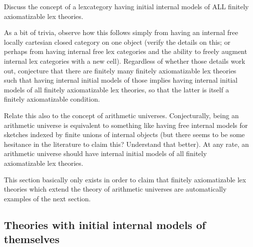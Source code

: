 \begin{TODOblock}
Discuss the concept of a lexcategory having initial internal models of ALL finitely axiomatizable lex theories.

As a bit of trivia, observe how this follows simply from having an internal free locally cartesian closed category on one object (verify the details on this; or perhaps from having internal free lex categories and the ability to freely augment internal lex categories with a new cell). Regardless of whether those details work out, conjecture that there are finitely many finitely axiomatizable lex theories such that having internal initial models of those implies having internal initial models of all finitely axiomatizable lex theories, so that the latter is itself a finitely axiomatizable condition.

Relate this also to the concept of arithmetic universes. Conjecturally, being an arithmetic universe is equivalent to something like having free internal models for sketches indexed by finite unions of internal objects (but there seems to be some hesitance in the literature to claim this? Understand that better). At any rate, an arithmetic universe should have internal initial models of all finitely axiomatizable lex theories.

This section basically only exists in order to claim that finitely axiomatizable lex theories which extend the theory of arithmetic universes are automatically examples of the next section.
\end{TODOblock}

\subsection{Theories with initial internal models of themselves}

